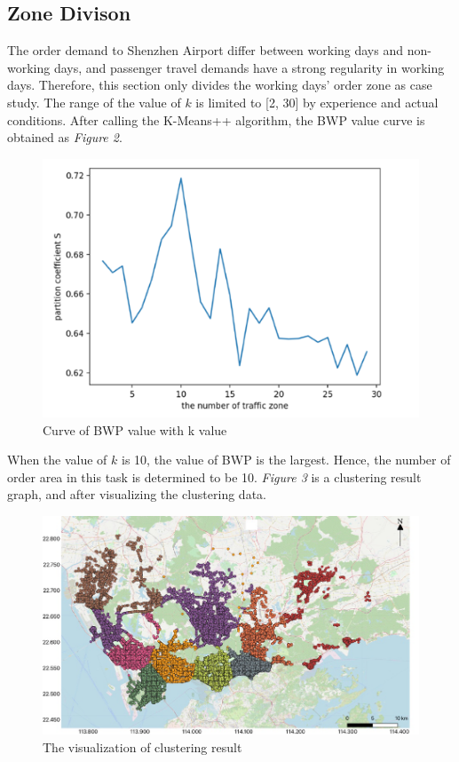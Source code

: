 \documentclass[sigconf]{acmart}
\begin{document}
\subsection{Zone Divison}
The order demand to Shenzhen Airport differ between working days and non-working days, and passenger travel demands have a strong regularity in working days. Therefore, this section only divides the working days’ order zone as case study.
The range of the value of $k$ is limited to [2, 30] by experience and actual conditions. After calling the K-Means++ algorithm, the BWP value curve is obtained as \textit{Figure 2}.
\begin{figure}[h]
  \centering
  \includegraphics[width=1\linewidth]{figure1}
  \caption{Curve of BWP value with k value}
\end{figure}
When the value of $k$ is 10, the value of BWP is the largest. Hence, the number of order area in this task is determined to be 10. \textit{Figure 3} is a clustering result graph, and after visualizing the clustering data.
\begin{figure}[h]
  \centering
  \includegraphics[width=1\linewidth]{figure2}
  \caption{The visualization of clustering result}
\end{figure}
\end{document}
